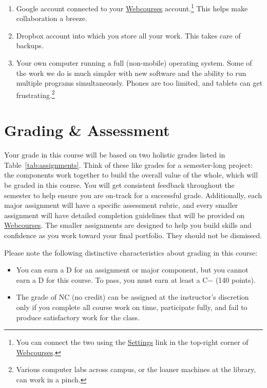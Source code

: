 \documentclass[11pt,oneside]{amsart}	%
\begin{document}
\begin{itemize}
\begin{enumerate}
		\item Google account connected to your \href{http://webcourses.instructure.com}{Webcourses} account.\footnote{You can connect the two using the \href{https://webcourses.ucf.edu/profile/settings}{Settings} link in the top-right corner of \href{http://webcourses.instructure.com}{Webcourses}.} This helps make collaboration a breeze.
		\item Dropbox account into which you store all your work. This takes care of backups.
		\item Your own computer running a full (non-mobile) operating system. Some of the work we do is much simpler with new software and the ability to run multiple programs simultaneously. Phones are too limited, and tablets can get frustrating.\footnote{Various computer labs across campus, or the loaner machines at the library, can work in a pinch.}
	\end{enumerate}
\end{itemize}

\section{Grading \& Assessment}
Your grade in this course will be based on two holistic grades listed in Table~\ref{tab:assignments}. Think of these like grades for a semester-long project: the components work together to build the overall value of the whole, which will be graded in this course. You will get consistent feedback throughout the semester to help ensure you are on-track for a successful grade. Additionally, each major assignment will have a specific assessment rubric, and every smaller assignment will have detailed completion guidelines that will be provided  on \href{https://webcourses2c.instructure.com/courses/985581}{Webcourses}.  The smaller assignments are designed to help you build skills and confidence as you work toward your final portfolio. They should not be dismissed.

Please note the following distinctive characteristics about grading in this course:
\begin{itemize}
	\item You can earn a D for an assignment or major component, but you cannot earn a D for this course. To pass, you must earn at least a C− (140 points).
	\item The grade of NC (no credit) can be assigned at the instructor's discretion only if you complete all course work on time, participate fully, and fail to produce satisfactory work for the class.
\end{itemize}
\end{document}
